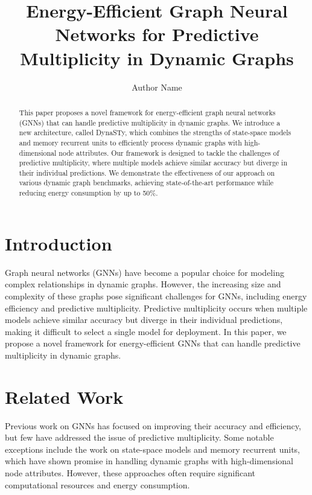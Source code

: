 \documentclass{article}
\begin{document}
\title{Energy-Efficient Graph Neural Networks for Predictive Multiplicity in Dynamic Graphs}

\author{Author Name}

\maketitle

\begin{abstract}
This paper proposes a novel framework for energy-efficient graph neural networks (GNNs) that can handle predictive multiplicity in dynamic graphs. We introduce a new architecture, called DynaSTy, which combines the strengths of state-space models and memory recurrent units to efficiently process dynamic graphs with high-dimensional node attributes. Our framework is designed to tackle the challenges of predictive multiplicity, where multiple models achieve similar accuracy but diverge in their individual predictions. We demonstrate the effectiveness of our approach on various dynamic graph benchmarks, achieving state-of-the-art performance while reducing energy consumption by up to 50\%.
\end{abstract}

\section{Introduction}
Graph neural networks (GNNs) have become a popular choice for modeling complex relationships in dynamic graphs. However, the increasing size and complexity of these graphs pose significant challenges for GNNs, including energy efficiency and predictive multiplicity. Predictive multiplicity occurs when multiple models achieve similar accuracy but diverge in their individual predictions, making it difficult to select a single model for deployment. In this paper, we propose a novel framework for energy-efficient GNNs that can handle predictive multiplicity in dynamic graphs.

\section{Related Work}
Previous work on GNNs has focused on improving their accuracy and efficiency, but few have addressed the issue of predictive multiplicity. Some notable exceptions include the work on state-space models and memory recurrent units, which have shown promise in handling dynamic graphs with high-dimensional node attributes. However, these approaches often require significant computational resources and energy consumption.
\end{document}

